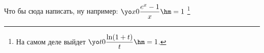 \label{vzpln}
    Что бы сюда написать, ну например: $\yo x0 \dfrac{e^x-1}x\hm=1$ \footnote{На самом деле выйдет $\yo t0\dfrac{\ln(1+t)}t\hm=1$.}
